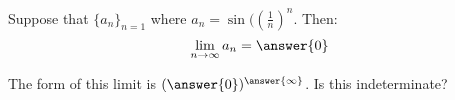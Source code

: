 \documentclass{ximera}
\author{Jim Talamo}
\begin{document}
\begin{exercise}


Suppose that $\{a_n \}_{n=1}$ where $a_n = \sin(\left(\frac{1}{n}\right)^{n}$.  Then:
\[
\lim_{n \to \infty} a_n = \answer{0}
\]

\begin{hint}
The form of this limit is $(\answer{0})^{\answer{\infty}}$.  Is this indeterminate?
\end{hint}
\end{exercise}
\end{document}

